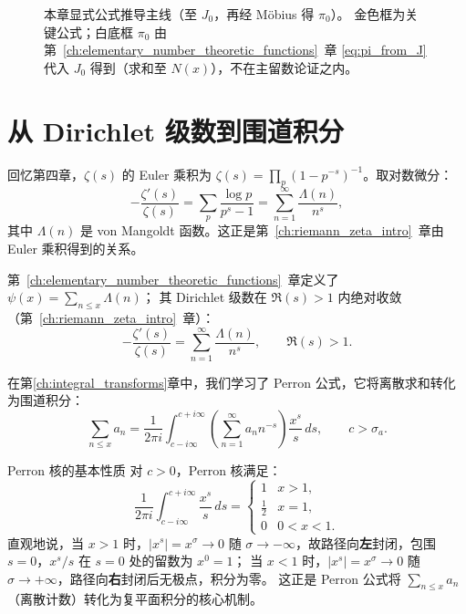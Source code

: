 \begin{figure}[htbp]
{%
}
\caption{本章显式公式推导主线（至 $J_0$，再经 Möbius 得 $\pi_0$）。
金色框为关键公式；白底框 $\pi_0$ 由第~\ref{ch:elementary_number_theoretic_functions}~章 \eqref{eq:pi_from_J} 代入 $J_0$ 得到（求和至 $N(x)$），不在主留数论证之内。}
\label{fig:explicit-roadmap}
\end{figure}

\section{从 Dirichlet 级数到围道积分}\label{sec:dirichlet-to-contour}

回忆第四章，$\zeta(s)$ 的 Euler 乘积为 $\zeta(s)=\prod_p(1-p^{-s})^{-1}$。取对数微分：
\[
-\frac{\zeta'(s)}{\zeta(s)} = \sum_p \frac{\log p}{p^s-1} = \sum_{n=1}^{\infty} \frac{\Lambda(n)}{n^s},
\]
其中 $\Lambda(n)$ 是 von Mangoldt 函数。这正是第~\ref{ch:riemann_zeta_intro}~章由 Euler 乘积得到的关系。

第~\ref{ch:elementary_number_theoretic_functions}~章定义了 $\psi(x)=\sum_{n\le x}\Lambda(n)$；
其 Dirichlet 级数在 $\Re(s)>1$ 内绝对收敛（第~\ref{ch:riemann_zeta_intro}~章）：
\[
-\frac{\zeta'(s)}{\zeta(s)} = \sum_{n=1}^{\infty} \frac{\Lambda(n)}{n^s}, \qquad \Re(s)>1.
\]

在第\ref{ch:integral_transforms}章中，我们学习了 Perron 公式，它将离散求和转化为围道积分：
\[
\sum_{n\le x} a_n = \frac{1}{2\pi i} \int_{c-i\infty}^{c+i\infty} \left( \sum_{n=1}^{\infty} a_n n^{-s} \right) \frac{x^s}{s} \, ds, \qquad c > \sigma_a.
\]

\begin{lemma}{Perron 核的基本性质}{}
\label{lem:perron_kernel}
对 $c > 0$，Perron 核满足：
\[
  \frac{1}{2\pi i}\int_{c-i\infty}^{c+i\infty}\frac{x^s}{s}\,ds
  = \begin{cases} 1 & x > 1, \\ \tfrac{1}{2} & x = 1, \\ 0 & 0 < x < 1. \end{cases}
\]
直观地说，当 $x>1$ 时，$|x^s|=x^\sigma \to 0$ 随 $\sigma\to-\infty$，故路径向\textbf{左}封闭，包围 $s=0$，$x^s/s$ 在 $s=0$ 处的留数为 $x^0=1$；
当 $x<1$ 时，$|x^s|=x^\sigma \to 0$ 随 $\sigma\to+\infty$，路径向\textbf{右}封闭后无极点，积分为零。
这正是 Perron 公式将 $\sum_{n\le x} a_n$（离散计数）转化为复平面积分的核心机制。
\end{lemma}

